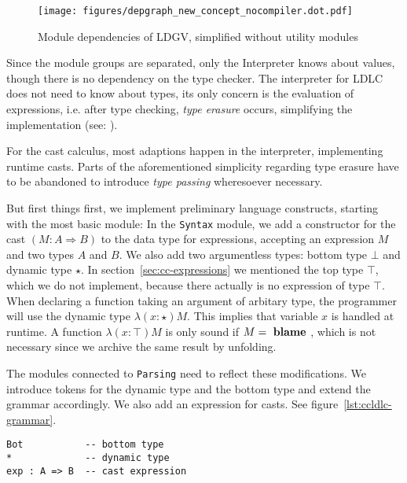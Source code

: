 \begin{figure}
 \centering
 \texttt{[image: figures/depgraph\_new\_concept\_nocompiler.dot.pdf]}
 \caption[Module dependencies of LDGV]{Module dependencies of LDGV, simplified without utility modules}
 \label{fig:dependency-graph}
\end{figure}

Since the module groups are separated, only the Interpreter knows about values, though there is no dependency on the type checker. The interpreter for LDLC does not need to know about types, its only concern is the evaluation of expressions, i.e. after type checking, \emph{type erasure} occurs, simplifying the implementation (see: \cite{crary2002}).

For the cast calculus, most adaptions happen in the interpreter, implementing runtime casts. Parts of the aforementioned simplicity regarding type erasure have to be abandoned to introduce \emph{type passing} wheresoever necessary.

But first things first, we implement preliminary language constructs, starting with the most basic module: In the \texttt{Syntax} module, we add a constructor for the cast $(M : A \Rightarrow B)$ to the data type for expressions, accepting an expression $M$ and two types $A$ and $B$. We also add two argumentless types: bottom type $\bot$ and dynamic type $\star$. In section~\ref{sec:cc-expressions} we mentioned the top type $\top$, which we do not implement, because there actually is no expression of type $\top$. When declaring a function taking an argument of arbitary type, the programmer will use the dynamic type $\lambda(x:\star)M$. This implies that variable $x$ is handled at runtime. A function $\lambda(x:\top)M$ is only sound if $M = \text{ \textbf{blame} }$, which is not necessary since we archive the same result by unfolding.

The modules connected to \texttt{Parsing} need to reflect these modifications. We introduce tokens for the dynamic type and the bottom type and extend the grammar accordingly. We also add an expression for casts. See figure~\ref{lst:ccldlc-grammar}.

\begin{lstlisting}[float,language=ldgv,
  caption=New language constructs for CCLDLC,
  label=lst:ccldlc-grammar]
Bot           -- bottom type
*             -- dynamic type
exp : A => B  -- cast expression
\end{lstlisting}

